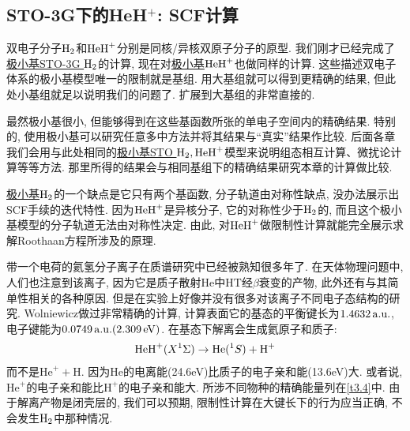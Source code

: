 {\subsection{STO-3G下的HeH$^+$: SCF计算}
双电子分子$\mathrm{H}_2$和$\mathrm{HeH}^+$分别是同核/异核双原子分子的原型. 我们刚才已经完成了\underline{极小基STO-3G $\mathrm{H}_2$}的计算, 现在对\underline{极小基$\mathrm{HeH}^+$}也做同样的计算. 这些描述双电子体系的极小基模型唯一的限制就是基组. 用大基组就可以得到更精确的结果, 但此处小基组就足以说明我们的问题了. 扩展到大基组的非常直接的. 

最然极小基很小, 但能够得到在这些基函数所张的单电子空间内的精确结果. 特别的, 使用极小基可以研究任意多中方法并将其结果与``真实''结果作比较. 后面各章我们会用与此处相同的\underline{极小基STO $\mathrm{H}_2,\mathrm{HeH}^+$}模型来说明组态相互计算、微扰论计算等等方法. 那里所得的结果会与相同基组下的精确结果研究本章的\hft 计算做比较.

\underline{极小基$\mathrm{H}_2$}的一个缺点是它只有两个基函数, 分子轨道由对称性缺点, 没办法展示出SCF手续的迭代特性. 因为$\mathrm{HeH}^+$是异核分子, 它的对称性少于$\mathrm{H}_2$的, 而且这个极小基模型的分子轨道无法由对称性决定. 由此, 对$\mathrm{HeH}^+$做限制性\hft 计算就能完全展示求解Roothaan方程所涉及的原理. 

带一个电荷的氦氢分子离子在质谱研究中已经被熟知很多年了. 在天体物理问题中, 人们也注意到该离子, 因为它是质子散射$\mathrm{He}$中$\mathrm{HT}$经$\beta$衰变的产物, 此外还有与其简单性相关的各种原因. 但是在实验上好像并没有很多对该离子不同电子态结构的研究. Wolniewicz做过非常精确的计算, 计算表面它的基态的平衡键长为$1.4632\,\mathrm{a.u.}$, 电子键能为$0.0749\,\mathrm{a.u.}(2.309\,\mathrm{eV})$. 在基态下解离会生成氦原子和质子:
\begin{align}
\mathrm{HeH}^+(X^1\Sigma) \to \mathrm{He}(^1S) + \mathrm{H}^+
\end{align}
而不是$\mathrm{He}^+ + \mathrm{H}$. 因为$\mathrm{He}$的电离能(24.6eV)比质子的电子亲和能(13.6eV)大. 或者说, $\mathrm{He}^+$的电子亲和能比$\mathrm{H}^+$的电子亲和能大. 所涉不同物种的精确能量列在\ref{t3.4}中. 由于解离产物是闭壳层的, 我们可以预期, 限制性\hft 计算在大键长下的行为应当正确, 不会发生$\mathrm{H}_2$中那种情况. 

}
